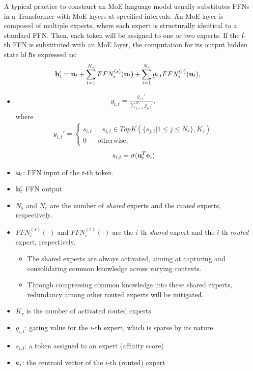 A typical practice to construct an MoE language model usually substitutes FFNs in a Transformer with MoE layers at specified intervals. An MoE layer is composed of multiple experts, where each expert is structurally identical to a standard FFN. Then, each token will be assigned to one or two experts. If the 𝑙-th FFN is substituted with an MoE layer, the computation for its output hidden state h𝑙 𝑡is expressed as:
\begin{align*}
	{\mathbf{h}}_t' = {\mathbf{u}}_t+\sum^{N_s}_{i=1}FFN_i^{(s)}({\mathbf{u}}_t)+\sum^{N_r}_{i=1}g_{i,t}FFN_i^{(r)}({\mathbf{u}}_t),
\end{align*}
\begin{itemize}
	\item 
		\begin{align*}
			g_{i,t} = \frac{g_{i,t}'}{\sum^{N_r}_{j=1}g_{j,t}'},
		\end{align*}
		where
		\begin{align*}
			g_{i,t}' = \begin{cases}
				s_{i,t}&\text{ } s_{i,t}\in TopK(\{s_{j,t}|1\leq j \leq N_r\}, K_r)\\
				0&\text{otherwise,}
			\end{cases}
		\end{align*}
		$$s_{i,t} = \sigma({\mathbf{u}}_t^T{\mathbf{e}}_i)$$
	\item ${\mathbf{u}}_t$: FFN input of the $t$-th token. 
	\item ${\mathbf{h}}_t'$ FFN output
	\item $N_s$ and $N_r$ are the number of \textit{shared} experts and the \textit{routed} experts, respectively.
	\item $FFN_i^{(s)}(\cdot)$ and $FFN_i^{(r)}(\cdot)$ are the $i$-th \textit{shared} expert and the $i$-th \textit{routed} expert, respectively.
		\begin{itemize}
			\item The shared experts are always activated, aiming at capturing and consolidating common knowledge across varying contexts. 
			\item Through compressing common knowledge into these shared experts, redundancy among other routed experts will be mitigated.
		\end{itemize}
	\item $K_r$ is the number of activated routed experts
	\item $g_{i,t}$: gating value for the $i$-th expert, which is sparse by its nature. 
	\item $s_{i,t}$: a token assigned to an expert (\ie affinity score)
	\item ${\mathbf{e}}_i$: the centroid vector of the $i$-th (routed) expert 

\end{itemize}
